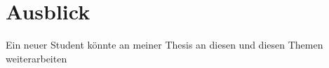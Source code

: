 \chapter{Ausblick}

Ein neuer Student könnte an meiner Thesis an diesen und diesen Themen weiterarbeiten